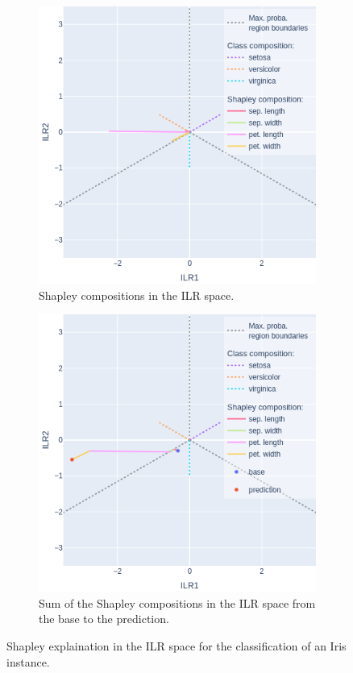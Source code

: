 \documentclass{article}
\theoremstyle{plain}
\theoremstyle{definition}
\theoremstyle{remark}
\begin{document}
\begin{figure}

  \begin{subfigure}{0.5\textwidth}
    \centering
    \includegraphics[width=0.8\linewidth]{figures/3classes/ilrplot.png}
    \caption{Shapley compositions in the ILR space.}
    \label{fig:3classesshap}
  \end{subfigure}
  
\vspace{0.5cm}
  \begin{subfigure}{0.5\textwidth}
    \centering
    \includegraphics[width=0.8\linewidth]{figures/3classes/ilrplotsum.png}
    \caption{Sum of the Shapley compositions in the ILR space from the base to the prediction.}
    \label{fig:3classesshapsum}
  \end{subfigure}
  
  \caption{Shapley explaination in the ILR space for the classification of an Iris instance.}
  \label{fig:3classes}
\end{figure}
\end{document}

